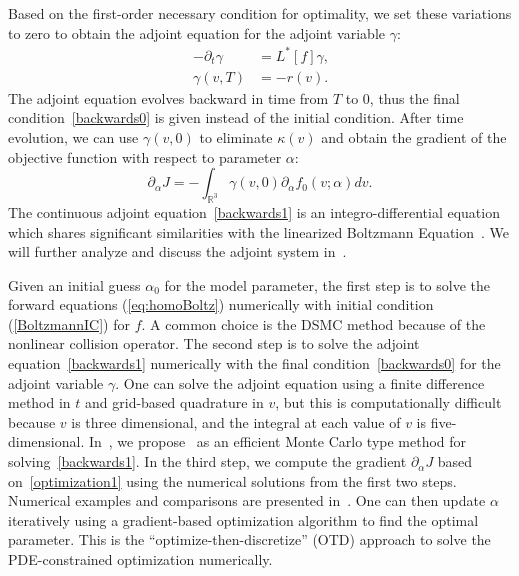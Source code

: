 \documentclass[times,final,nopreprintline]{elsarticle}
\newcommand{\bbR}{\mathbb R} \newcommand{\bbS}{\mathbb S}
\newcommand{\Rthree}{{\bbR^3}}
\begin{document}
Based on the first-order necessary condition for optimality, we set these variations to zero to obtain the adjoint equation for the adjoint variable $\gamma$:
\begin{subequations}~\label{eq:backwards}
\begin{align}
- \partial_t  \gamma &=  L^*[f] \gamma, \label{backwards1} \\
\gamma(v,T) &= - r(v).  \label{backwards0}
\end{align}
\end{subequations}
The adjoint equation evolves backward in time from $T$ to $0$, thus the final condition~\eqref{backwards0} is given instead of the initial condition. After time evolution, we can use $\gamma(v,0)$ to eliminate $\kappa(v)$ and obtain the gradient of the objective function with respect to parameter $\alpha$:
\begin{equation}  \label{optimization1}
\partial_\alpha J = -\int_\Rthree \gamma(v,0) \partial_\alpha f_0(v;\alpha) dv.
\end{equation}
The continuous adjoint equation~\eqref{backwards1} is an integro-differential equation which shares significant similarities with the linearized Boltzmann Equation~\cite{cercignani1969mathematical}. We will further analyze and discuss the adjoint system in~.


Given an initial guess $\alpha_0$ for the model parameter, the first step is to solve the forward equations (\ref{eq:homoBoltz}) numerically with initial condition (\ref{BoltzmannIC}) for $f$. A common choice is the DSMC method because of the nonlinear collision operator. The second step is to solve the adjoint equation~\eqref{backwards1} numerically with the final condition~\eqref{backwards0} for the adjoint variable $\gamma$. One can solve the adjoint equation using a finite difference method in $t$ and grid-based quadrature in $v$, but this is computationally difficult because $v$ is three dimensional, and the integral at each value of $v$ is five-dimensional. In~, we propose~ as an efficient Monte Carlo type method for solving~\eqref{backwards1}. In the third step, we compute the gradient $\partial_{\alpha} J$ based on~\eqref{optimization1} using the numerical solutions from the first two steps. Numerical examples and comparisons are presented in~. One can then update $\alpha$ iteratively using a gradient-based optimization algorithm to find the optimal parameter. This is the ``optimize-then-discretize'' (OTD) approach to solve the PDE-constrained optimization numerically. 
\end{document}
